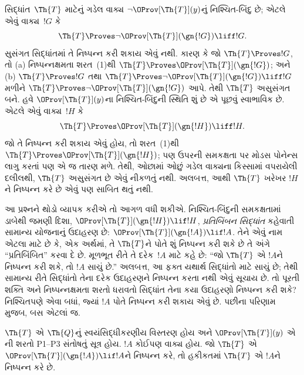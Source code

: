 \begingroup
\makeatletter{}\makeatother


\label{guunit:OLP-0320}


સિદ્ધાંત~$\Th{T}$ માટેનું ગડેલ વાક્ય $\lnot\OProv[\Th{T}](y)$નું નિશ્ચિત-બિંદુ છે; એટલે એવું વાક્ય~$!G$ કે
\[
\Th{T} \Proves \lnot \OProv[\Th{T}](\gn{!G}) \liff !G.
\]
સુસંગત સિદ્ધાંતમાં તે નિષ્પન્ન કરી શકાય એવું નથી. કારણ કે જો $\Th{T} \Proves !G$, તો (a) નિષ્પન્નક્ષમતા શરત~(1)થી $\Th{T} \Proves \OProv[\Th{T}](\gn{!G})$; અને (b) $\Th{T} \Proves !G$ તથા $\Th{T} \Proves \lnot \OProv[\Th{T}](\gn{!G}) \liff !G$ મળીને $\Th{T} \Proves \lnot \OProv[\Th{T}](\gn{!G})$ આપે. તેથી $\Th{T}$ અસુસંગત બને. હવે $\OProv[\Th{T}](y)$ના નિશ્ચિત-બિંદુની સ્થિતિ શું છે એ પૂછવું સ્વાભાવિક છે. એટલે એવું વાક્ય~$!H$ કે
\[
\Th{T} \Proves \OProv[\Th{T}](\gn{!H}) \liff !H.
\]
જો તે નિષ્પન્ન કરી શકાય એવું હોય, તો શરત~(1)થી $\Th{T} \Proves \OProv[\Th{T}](\gn{!H})$; પણ ઉપરની સમકક્ષતા પર મોડસ પોનેન્સ લાગુ કરતાં પણ એ જ તારણ મળે. તેથી, ઓછામાં ઓછું ગડેલ વાક્યના કિસ્સામાં વપરાયેલી દલીલથી, $\Th{T}$ અસુસંગત છે એવું નીકળતું નથી. અલબત્ત, આથી $\Th{T}$ ખરેખર $!H$ને નિષ્પન્ન કરે છે એવું પણ સાબિત થતું નથી.

આ પ્રશ્નને થોડો વ્યાપક કરીએ તો આગળ વધી શકીએ. નિશ્ચિત-બિંદુની સમકક્ષતામાં ડાબેથી જમણી દિશા, $\OProv[\Th{T}](\gn{!H}) \lif !H$, \emph{પ્રતિબિંબન સિદ્ધાંત} કહેવાતી સામાન્ય યોજનાનું ઉદાહરણ છે: $\OProv[\Th{T}](\gn{!A}) \lif !A$. તેને એવું નામ એટલા માટે છે કે, એક અર્થમાં, તે $\Th{T}$ને પોતે શું નિષ્પન્ન કરી શકે છે તે અંગે ``પ્રતિબિંબિત'' કરવા દે છે. મૂળભૂત રીતે તે દરેક~$!A$ માટે કહે છે: ``જો $\Th{T}$ એ $!A$ને નિષ્પન્ન કરી શકે, તો $!A$ સાચું છે.'' અલબત્ત, આ ફક્ત યથાર્થ સિદ્ધાંતો માટે સાચું છે; તેથી સામાન્ય રીતે સિદ્ધાંતો તેના દરેક ઉદાહરણને નિષ્પન્ન કરતા નથી એવું સૂચાય છે. તો પૂરતી શક્તિ અને નિષ્પન્નક્ષમતા શરતો ધરાવતો સિદ્ધાંત તેના કયા ઉદાહરણો નિષ્પન્ન કરી શકે? નિશ્ચિતપણે એવા બધાં, જ્યાં $!A$ પોતે નિષ્પન્ન કરી શકાય એવું છે. પછીના પરિણામ મુજબ, બસ એટલાં જ.

\begin{thm}
$\Th{T}$ એ $\Th{Q}$નું સ્વયંસિદ્ધીકરણીય વિસ્તરણ હોય અને $\OProv[\Th{T}](y)$ એ ની શરતો P1--P3 સંતોષતું સૂત્ર હોય. $!A$ કોઈપણ વાક્ય હોય. જો $\Th{T}$ એ $\OProv[\Th{T}](\gn{!A}) \lif !A$ને નિષ્પન્ન કરે, તો હકીકતમાં $\Th{T}$ એ $!A$ને નિષ્પન્ન કરે છે.
\end{thm}

